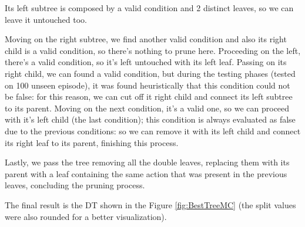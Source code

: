 Its left subtree is composed by a valid condition and 2 distinct leaves, so we can leave it untouched too.

Moving on the right subtree, we find another valid condition and also its right child is a valid condition, so there's nothing to prune here. Proceeding on the left, there's a valid condition, so it's left untouched with its left leaf. Passing on its right child, we can found a valid condition, but during the testing phases (tested on 100 unseen episode), it was found heuristically that this condition could not be false: for this reason, we can cut off it right child and connect its left subtree to its parent. Moving on the next condition, it's a valid one, so we can proceed with it's left child (the last condition); this condition is always evaluated as false due to the previous conditions: so we can remove it with its left child and connect its right leaf to its parent, finishing this process.

Lastly, we pass the tree removing all the double leaves, replacing them with its parent with a leaf containing the same action that was present in the previous leaves, concluding the pruning process.

The final result is the DT shown in the Figure \ref{fig:BestTreeMC} (the split values were also rounded for a better visualization).